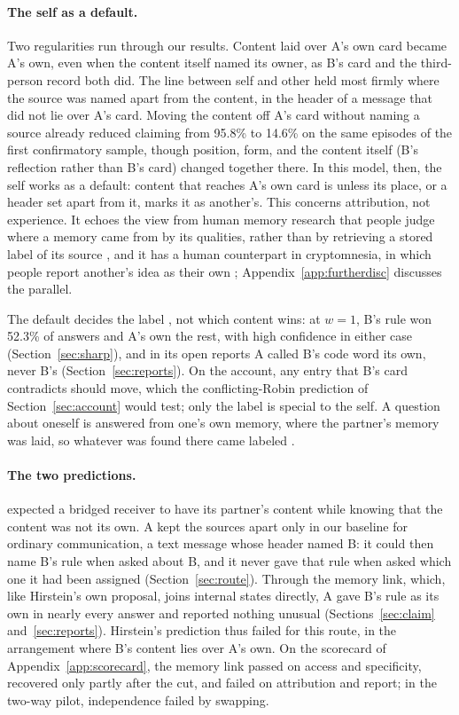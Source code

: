 \paragraph{The self as a default.} Two regularities run through our
results. Content laid over A's own card became A's own, even when the
content itself named its owner, as B's card and the third-person record
both did. The line between self and other held most firmly where the
source was named apart from the content, in the header of a message that
did not lie over A's card. Moving the content off A's card without
naming a source already reduced claiming from 95.8\% to 14.6\% on the
same episodes of the first confirmatory sample, though position, form,
and the content itself (B's reflection rather than B's card) changed
together there. In this model, then, the self works as a default:
content that reaches A's own card is  unless its place, or a
header set apart from it, marks it as another's. This concerns
attribution, not experience. It echoes the view from human memory
research that people judge where a memory came from by its qualities,
rather than by retrieving a stored label of its source
\citep[][p.~3]{johnson1993source}, and it has a human counterpart in
cryptomnesia, in which people report another's idea as their own
\citep{brown1989cryptomnesia}; Appendix~\ref{app:furtherdisc} discusses
the parallel.

The default decides the label , not which content wins: at
$w=1$, B's rule won 52.3\% of answers and A's own the rest, with high
confidence in either case (Section~\ref{sec:sharp}), and in its open reports A
called B's code word its own, never B's (Section~\ref{sec:reports}). On
the account, any entry that B's card contradicts should move, which the
conflicting-Robin prediction of Section~\ref{sec:account} would test;
only the label is special to the self. A question about oneself is
answered from one's own memory, where the partner's memory was laid, so
whatever was found there came labeled .

\paragraph{The two predictions.} \citet{hirstein2008mindmelding}
expected a bridged receiver to have its partner's content while knowing
that the content was not its own. A kept the sources apart only in our
baseline for ordinary communication, a text message whose header named
B: it could then name B's rule when asked about B, and it never gave
that rule when asked which one it had been assigned
(Section~\ref{sec:route}). Through the memory link, which, like
Hirstein's own proposal, joins internal states directly, A gave B's rule
as its own in nearly every answer and reported nothing unusual
(Sections~\ref{sec:claim} and~\ref{sec:reports}). Hirstein's prediction
thus failed for this route, in the arrangement where B's content lies
over A's own. On the scorecard of Appendix~\ref{app:scorecard}, the
memory link passed on access and specificity, recovered only partly
after the cut, and failed on attribution and report; in the two-way
pilot, independence failed by swapping.

